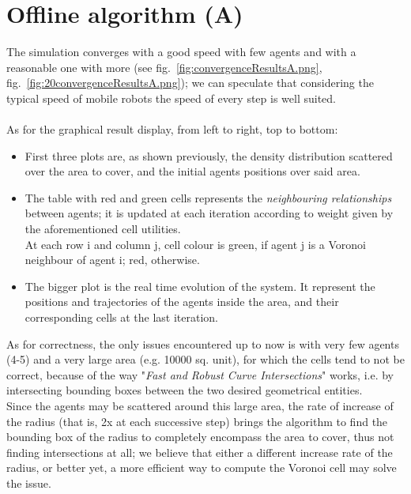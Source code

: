 \documentclass[a4paper,11pt,oneside]{book}
\begin{document}
	
	
	
	\section{Offline algorithm (A)}
	
	The simulation converges with a good speed with few agents and with a reasonable one with more (see fig.~\ref{fig:convergenceResultsA.png}, fig.~\ref{fig:20convergenceResultsA.png}); we can speculate that considering the typical speed of mobile robots the speed of every step is well suited.\\\\
	As for the graphical result display, from left to right, top to bottom:
	\begin{itemize}
		\item First three plots are, as shown previously, the density distribution scattered over the area to cover, and the initial agents positions over said area.
		
		\item The table with red and green cells represents the \emph{neighbouring relationships} between agents; it is updated at each iteration according to weight given by the aforementioned cell utilities.\\
		
		At each row i and column j, cell colour is
			\subitem green, if agent j is a Voronoi neighbour of agent i;
			\subitem red, otherwise.
		
		\item The bigger plot is the real time evolution of the system. It represent the positions and trajectories of the agents inside the area, and their corresponding cells at the last iteration.
		
	\end{itemize}
	As for correctness, the only issues encountered up to now is with very few agents (4-5) and a very large area (e.g. 10000 sq. unit), for which the cells tend to not be correct, because of the way "\emph{Fast and Robust Curve Intersections}" works, i.e. by intersecting bounding boxes between the two desired geometrical entities.\\
	Since the agents may be scattered around this large area, the rate of increase of the radius (that is, 2x at each successive step) brings the algorithm to find the bounding box of the radius to completely encompass the area to cover, thus not finding intersections at all; we believe that either a different increase rate of the radius, or better yet, a more efficient way to compute the Voronoi cell may solve the issue.
	
\end{document}
